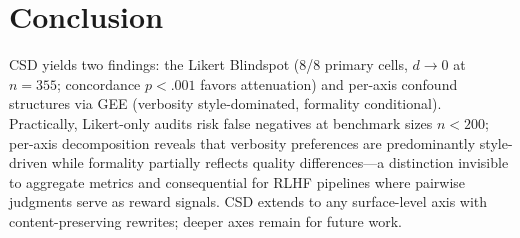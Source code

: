 \section{Conclusion}
\label{sec:conclusion}
CSD yields two findings: the Likert Blindspot (8/8 primary cells, $d \!\to\! 0$ at $n{=}355$; concordance $p < .001$ favors attenuation) and per-axis confound structures via GEE (verbosity style-dominated, formality conditional).
Practically, Likert-only audits risk false negatives at benchmark sizes $n < 200$; per-axis decomposition reveals that verbosity preferences are predominantly style-driven while formality partially reflects quality differences---a distinction invisible to aggregate metrics and consequential for RLHF pipelines where pairwise judgments serve as reward signals.
CSD extends to any surface-level axis with content-preserving rewrites; deeper axes remain for future work.
